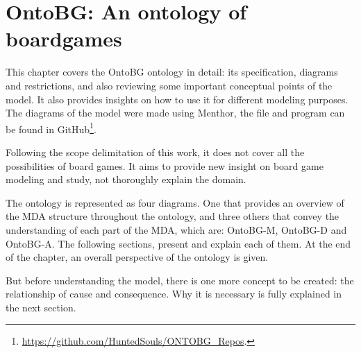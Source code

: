 \chapter{OntoBG: An ontology of boardgames}


This chapter covers the OntoBG ontology in detail: its specification, diagrams and restrictions, and also reviewing some important conceptual points of the model. It also provides insights on how to use it for different modeling purposes. The diagrams of the model were made using Menthor, the file and program can be found in GitHub\footnote{ \url{https://github.com/HuntedSouls/ONTOBG_Repos}.}.

Following the scope delimitation of this work, it does not cover all the possibilities of board games. It aims to provide new insight on board game modeling and study, not thoroughly explain the domain.

The ontology is represented as four diagrams. One that provides an overview of the MDA structure throughout the ontology, and three others that convey the understanding of each part of the MDA, which are: OntoBG-M, OntoBG-D and OntoBG-A. The following sections, present and explain each of them. At the end of the chapter, an overall perspective of the ontology is given. 



But before understanding the model, there is one more concept to be created: the relationship of cause and consequence. Why it is necessary is fully explained in the next section.







